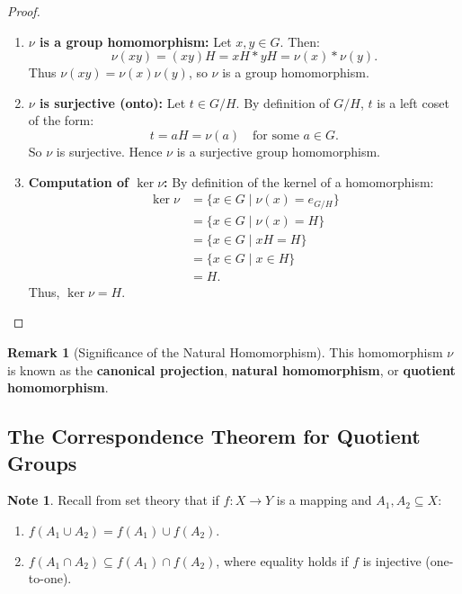 \documentclass[12pt]{article}
\theoremstyle{definition}
\newtheorem*{note}{Note}
\newtheorem*{remark}{Remark}
\theoremstyle{plain}
\begin{document}
\begin{proof}
\begin{enumerate}
    \item \textbf{$\nu$ is a group homomorphism:}
    Let $x, y \in G$. Then:
    \[
    \nu(xy) = (xy)H = xH * yH = \nu(x) * \nu(y).
    \]
    Thus $\nu(xy) = \nu(x)\nu(y)$, so $\nu$ is a group homomorphism.
    
    \item \textbf{$\nu$ is surjective (onto):}
    Let $t \in G/H$. By definition of $G/H$, $t$ is a left coset of the form:
    \[
    t = aH = \nu(a) \quad \text{for some } a \in G.
    \]
    So $\nu$ is surjective. Hence $\nu$ is a surjective group homomorphism.
    
    \item \textbf{Computation of $\ker \nu$:}
    By definition of the kernel of a homomorphism:
    \begin{align*}
    \ker \nu &= \{ x \in G \mid \nu(x) = e_{G/H} \} \\
    &= \{ x \in G \mid \nu(x) = H \} \\
    &= \{ x \in G \mid xH = H \} \\
    &= \{ x \in G \mid x \in H \} \\
    &= H.
    \end{align*}
    Thus, $\ker \nu = H$.
\end{enumerate}
\end{proof}

\begin{remark}[Significance of the Natural Homomorphism]
This homomorphism $\nu$ is known as the \textbf{canonical projection}, \textbf{natural homomorphism}, or \textbf{quotient homomorphism}.
\end{remark}

\subsection{The Correspondence Theorem for Quotient Groups}

\begin{note}
Recall from set theory that if $f: X \to Y$ is a mapping and $A_1, A_2 \subseteq X$:
\begin{enumerate}
    \item $f(A_1 \cup A_2) = f(A_1) \cup f(A_2)$.
    \item $f(A_1 \cap A_2) \subseteq f(A_1) \cap f(A_2)$, where equality holds if $f$ is injective (one-to-one).
\end{enumerate}
\end{note}
\end{document}
